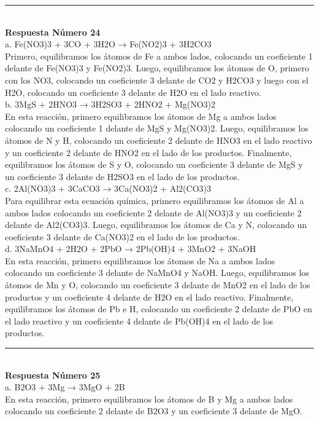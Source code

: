 \documentclass{article}
\begin{document}
\noindent\rule{\textwidth}{1pt} \\
\textbf{Respuesta Número 24} \\
a. Fe(NO3)3 + 3CO + 3H2O → Fe(NO2)3 + 3H2CO3\\
   Primero, equilibramos los átomos de Fe a ambos lados, colocando un coeficiente 1 delante de Fe(NO3)3 y Fe(NO2)3. Luego, equilibramos los átomos de O, primero con los NO3, colocando un coeficiente 3 delante de CO2 y H2CO3 y luego con el H2O, colocando un coeficiente 3 delante de H2O en el lado reactivo.\\
b. 3MgS + 2HNO3 → 3H2SO3 + 2HNO2 + Mg(NO3)2\\
   En esta reacción, primero equilibramos los átomos de Mg a ambos lados colocando un coeficiente 1 delante de MgS y Mg(NO3)2. Luego, equilibramos los átomos de N y H, colocando un coeficiente 2 delante de HNO3 en el lado reactivo y un coeficiente 2 delante de HNO2 en el lado de los productos. Finalmente, equilibramos los átomos de S y O, colocando un coeficiente 3 delante de MgS y un coeficiente 3 delante de H2SO3 en el lado de los productos.\\
c. 2Al(NO3)3 + 3CaCO3 → 3Ca(NO3)2 + Al2(CO3)3\\
   Para equilibrar esta ecuación química, primero equilibramos los átomos de Al a ambos lados colocando un coeficiente 2 delante de Al(NO3)3 y un coeficiente 2 delante de Al2(CO3)3. Luego, equilibramos los átomos de Ca y N, colocando un coeficiente 3 delante de Ca(NO3)2 en el lado de los productos.\\
d. 3NaMnO4 + 2H2O + 2PbO → 2Pb(OH)4 + 3MnO2 + 3NaOH\\
   En esta reacción, primero equilibramos los átomos de Na a ambos lados colocando un coeficiente 3 delante de NaMnO4 y NaOH. Luego, equilibramos los átomos de Mn y O, colocando un coeficiente 3 delante de MnO2 en el lado de los productos y un coeficiente 4 delante de H2O en el lado reactivo. Finalmente, equilibramos los átomos de Pb e H, colocando un coeficiente 2 delante de PbO en el lado reactivo y un coeficiente 4 delante de Pb(OH)4 en el lado de los productos.\\
\noindent\rule{\textwidth}{1pt} \\
\textbf{Respuesta Número 25} \\
a. B2O3 + 3Mg → 3MgO + 2B\\
En esta reacción, primero equilibramos los átomos de B y Mg a ambos lados colocando un coeficiente 2 delante de B2O3 y un coeficiente 3 delante de MgO. \\
\end{document}
